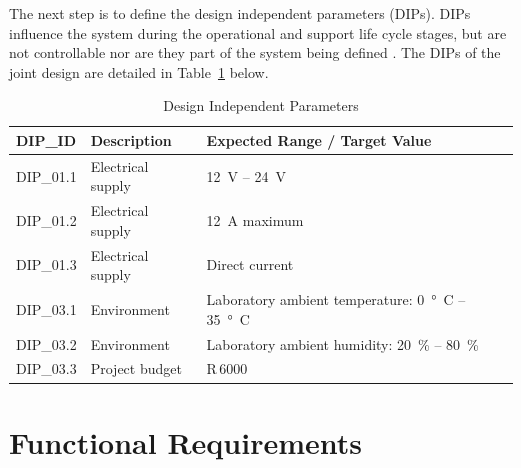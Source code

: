 The next step is to define the design independent parameters (DIPs). DIPs influence the system during the operational and support life cycle stages, but are not controllable nor are they part of the system being defined \citep{Callister:2011}. The DIPs of the joint design are detailed in Table~\ref{tab:DIPs} below.
\begin{table}[H]
	\centering
	\caption{Design Independent Parameters}
	\label{tab:DIPs}
	\begin{tabular}{|l|l|l|}
		\hline
		\textbf{DIP\_ID} & \textbf{Description} & \textbf{Expected Range / Target Value} \\\hline
		DIP\_01.1 & Electrical supply & \SI{12}{V} -- \SI{24}{V} \\\hline
		DIP\_01.2 & Electrical supply & \SI{12}{A} maximum \\\hline
		DIP\_01.3 & Electrical supply & Direct current \\\hline
		DIP\_03.1 & Environment & Laboratory ambient temperature: \SI{0}{\degree C} -- \SI{35}{\degree C} \\\hline
		DIP\_03.2 & Environment & Laboratory ambient humidity: \SI{20}{\%} -- \SI{80}{\%} \\\hline
		DIP\_03.3 & Project budget & R\,6000 \\\hline
	\end{tabular}
\end{table}

\section{Functional Requirements}

